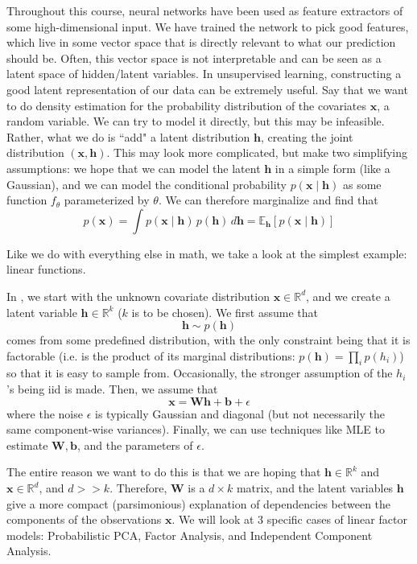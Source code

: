 \documentclass{article}
\begin{document}
  Throughout this course, neural networks have been used as feature extractors of some high-dimensional input. We have trained the network to pick good features, which live in some vector space that is directly relevant to what our prediction should be. Often, this vector space is not interpretable and can be seen as a latent space of hidden/latent variables. In unsupervised learning, constructing a good latent representation of our data can be extremely useful. Say that we want to do density estimation for the probability distribution of the covariates $\mathbf{x}$, a random variable. We can try to model it directly, but this may be infeasible. Rather, what we do is ``add" a latent distribution $\mathbf{h}$, creating the joint distribution $(\mathbf{x}, \mathbf{h})$. This may look more complicated, but make two simplifying assumptions: we hope that we can model the latent $\mathbf{h}$ in a simple form (like a Gaussian), and we can model the conditional probability $p(\mathbf{x} \mid \mathbf{h})$ as some function $f_\theta$ parameterized by $\theta$. We can therefore marginalize and find that 
  \begin{equation} 
    p(\mathbf{x}) = \int p(\mathbf{x} \mid \mathbf{h}) \, p(\mathbf{h}) \,d\mathbf{h} = \mathbb{E}_\mathbf{h} [p(\mathbf{x} \mid \mathbf{h})] 
  \end{equation}

  Like we do with everything else in math, we take a look at the simplest example: linear functions. 

  In , we start with the unknown covariate distribution $\mathbf{x} \in \mathbb{R}^d$, and we create a latent variable $\mathbf{h} \in \mathbb{R}^k$ ($k$ is to be chosen). We first assume that 
  \[\mathbf{h} \sim p(\mathbf{h})\] 
  comes from some predefined distribution, with the only constraint being that it is factorable (i.e. is the product of its marginal distributions: $p(\mathbf{h}) = \prod_i p(h_i)$) so that it is easy to sample from. Occasionally, the stronger assumption of the $h_i$'s being iid is made. Then, we assume that 
  \[\mathbf{x} = \mathbf{W} \mathbf{h} + \mathbf{b} + \epsilon\] 
  where the noise $\epsilon$ is typically Gaussian and diagonal (but not necessarily the same component-wise variances). Finally, we can use techniques like MLE to estimate $\mathbf{W}, \mathbf{b}$, and the parameters of $\epsilon$.  

  The entire reason we want to do this is that we are hoping that $\mathbf{h} \in \mathbb{R}^k$ and $\mathbf{x} \in \mathbb{R}^d$, and $d >> k$. Therefore, $\mathbf{W}$ is a $d \times k$ matrix, and the latent variables $\mathbf{h}$ give a more compact (parsimonious)  explanation of dependencies between the components of the observations $\mathbf{x}$. We will look at 3 specific cases of linear factor models: Probabilistic PCA, Factor Analysis, and Independent Component Analysis. 
\end{document}
